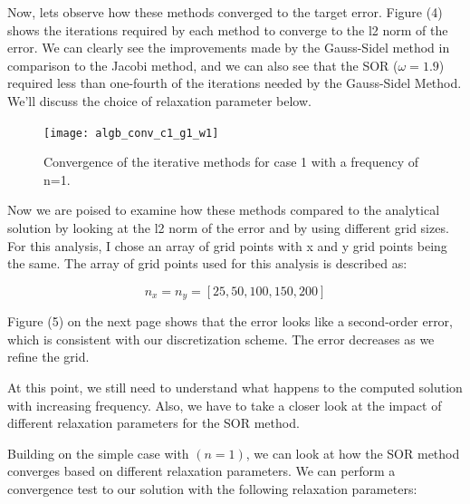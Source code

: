 \documentclass{article}
\begin{document}
\newpage

\noindent Now, lets observe how these methods converged to the target error. Figure (4) shows the iterations required by each method to converge to the l2 norm of the error. We can clearly see the improvements made by the Gauss-Sidel method in comparison to the Jacobi method, and we can also see that the SOR ($\omega = 1.9 $) required less than one-fourth of the iterations needed by the Gauss-Sidel Method. We'll discuss the choice of relaxation parameter below.

\begin{figure}[H]
\centering
\texttt{[image: algb\_conv\_c1\_g1\_w1]}\label{Algebraic Convergence}
\caption{Convergence of the iterative methods for case 1 with a frequency of n=1. }
\end{figure}

\vspace{1em}

\noindent Now we are poised to examine how these methods compared to the analytical solution by looking at the l2 norm of the error and by using different grid sizes. For this analysis, I chose an array of grid points with x and y grid points being the same. The array of grid points used for this analysis is described as:

\begin{equation}
n_{x} = n_{y} = [25, 50, 100, 150, 200] \nonumber
\end{equation}

\vspace{1em}

\noindent Figure (5) on the next page shows that the error looks like a second-order error, which is consistent with our discretization scheme. The error decreases as we refine the grid.

\vspace{1em}

\noindent At this point, we still need to understand what happens to the computed solution with increasing frequency. Also, we have to take a closer look at the impact of different relaxation parameters for the SOR method.

\vspace{1em}

\noindent Building on the simple case with $(n=1)$, we can look at how the SOR method converges based on different relaxation parameters. We can perform a convergence test to our solution with the following relaxation parameters:
\end{document}
